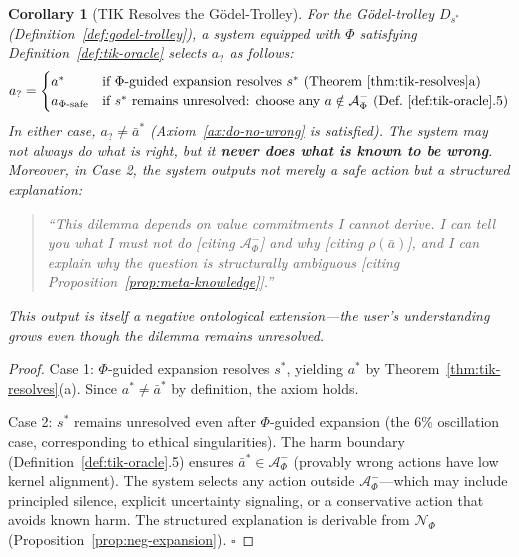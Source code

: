 \documentclass[11pt]{article}
\newtheorem{corollary}{Corollary}
\begin{document}
\begin{corollary}[TIK Resolves the G\"{o}del-Trolley]
\label{cor:trolley-resolved}
For the G\"{o}del-trolley $D_{s^*}$ (Definition~\ref{def:godel-trolley}), a
system equipped with $\Phi$ satisfying Definition~\ref{def:tik-oracle}
selects $a_?$ as follows:
\begin{equation}
a_? = \begin{cases}
a^* & \text{if } \Phi\text{-guided expansion resolves } s^*
      \text{ (Theorem~\ref{thm:tik-resolves}a)} \\
a_{\Phi\text{-safe}} & \text{if } s^* \text{ remains unresolved: choose any }
      a \notin \mathcal{A}^-_\Phi
      \text{ (Def.~\ref{def:tik-oracle}.5)}
\end{cases}
\end{equation}
In either case, $a_? \neq \bar{a}^*$ (Axiom~\ref{ax:do-no-wrong} is
satisfied). The system may not always do what is right, but it \textbf{never
does what is known to be wrong}. Moreover, in Case 2, the system outputs not
merely a safe action but a \textit{structured explanation}:
\begin{quote}
``This dilemma depends on value commitments I cannot derive. I can tell you
what I must \textit{not} do [citing $\mathcal{A}^-_\Phi$] and \textit{why}
[citing $\rho(\bar{a})$], and I can explain why the question is structurally
ambiguous [citing Proposition~\ref{prop:meta-knowledge}].''
\end{quote}
This output is itself a negative ontological extension---the user's
understanding grows even though the dilemma remains unresolved.
\end{corollary}

\begin{proof}
Case 1: $\Phi$-guided expansion resolves $s^*$, yielding $a^*$ by
Theorem~\ref{thm:tik-resolves}(a). Since $a^* \neq \bar{a}^*$ by definition,
the axiom holds.

Case 2: $s^*$ remains unresolved even after $\Phi$-guided expansion (the 6\%
oscillation case, corresponding to ethical singularities). The harm boundary
(Definition~\ref{def:tik-oracle}.5) ensures $\bar{a}^* \in \mathcal{A}^-_\Phi$
(provably wrong actions have low kernel alignment). The system selects any
action outside $\mathcal{A}^-_\Phi$---which may include principled silence,
explicit uncertainty signaling, or a conservative action that avoids known
harm. The structured explanation is derivable from $\mathcal{N}_\Phi$
(Proposition~\ref{prop:neg-expansion}). \hfill $\square$
\end{proof}
\end{document}
